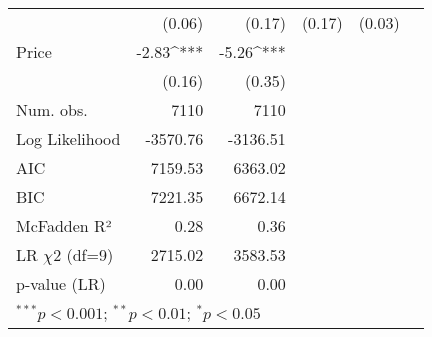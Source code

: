 \begin{table}[H]
\begin{center}
\begin{tabular}{l D{.}{.}{5.5} D{.}{.}{5.5} D{.}{.}{2.5} D{.}{.}{2.5} D{.}{.}{3.2}}
                                   & (0.06)      & (0.17)      & (0.17)      & (0.03)     &        \\
Price                              & -2.83^{***} & -5.26^{***} &             &            &        \\
                                   & (0.16)      & (0.35)      &             &            &        \\
\midrule
Num. obs.                          & 7110        & 7110        &             &            &        \\
Log Likelihood                     & -3570.76    & -3136.51    &             &            &        \\
AIC                                & 7159.53     & 6363.02     &             &            &        \\
BIC                                & 7221.35     & 6672.14     &             &            &        \\
McFadden R²                        & 0.28        & 0.36        &             &            &        \\
LR $\chi 2$ (df=9)                       & 2715.02     & 3583.53     &             &            &        \\
p-value (LR)                       & 0.00        & 0.00        &             &            &        \\
\bottomrule
{}
\end{tabular}
\end{center}
\end{table}
